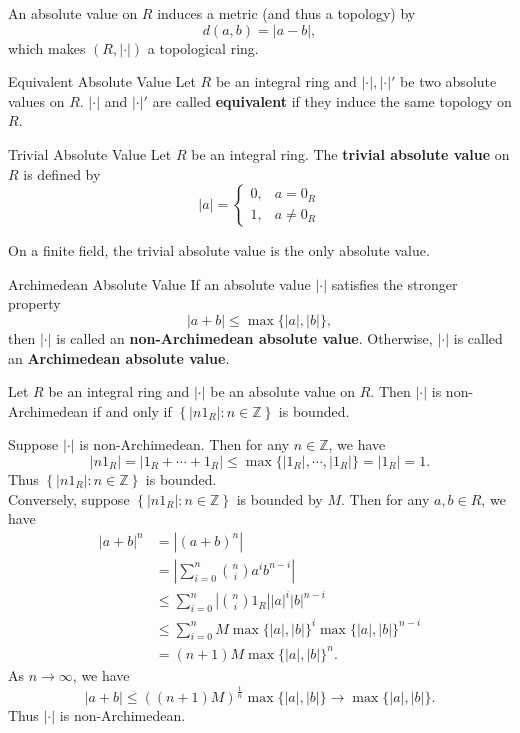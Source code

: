 An absolute value on $R$ induces a metric (and thus a topology) by 
\[
    d(a,b)=|a-b|,
\]
which makes $(R,|\cdot|)$ a topological ring. 
\begin{definition}{Equivalent Absolute Value}{}
    Let $R$ be an integral ring and $|\cdot|,|\cdot|'$ be two absolute values on $R$. $|\cdot|$ and $|\cdot|'$ are called \textbf{equivalent} if they induce the same topology on $R$.
\end{definition}

\begin{definition}{Trivial Absolute Value}{}
    Let $R$ be an integral ring. The \textbf{trivial absolute value} on $R$ is defined by 
    \[
        |a|=\begin{cases}
            0, & a=0_R\\
            1, & a\ne 0_R
        \end{cases}
    \]
\end{definition}

On a finite field, the trivial absolute value is the only absolute value.
\begin{definition}{Archimedean Absolute Value}{}
    If an absolute value $|\cdot|$ satisfies the stronger property 
    \[
        |a+b|\le \max\{|a|,|b|\},
    \]
    then $|\cdot|$ is called an \textbf{non-Archimedean absolute value}. Otherwise, $|\cdot|$ is called an \textbf{Archimedean absolute value}.
\end{definition}

\begin{proposition}{}{}
    Let $R$ be an integral ring and $|\cdot|$ be an absolute value on $R$. Then $|\cdot|$ is non-Archimedean if and only if $\left\{ |n1_R|:n\in \mathbb{Z}\right\}$ is bounded.
\end{proposition}

\begin{prf}
    Suppose $|\cdot|$ is non-Archimedean. Then for any $n\in\mathbb{Z}$, we have
    \[
        |n1_R|=|1_R+\cdots+1_R|\le \max\{|1_R|,\cdots,|1_R|\}=|1_R|=1.
    \]
    Thus $\left\{ |n1_R|:n\in \mathbb{Z}\right\}$ is bounded.\\
    Conversely, suppose $\left\{ |n1_R|:n\in \mathbb{Z}\right\}$ is bounded by $M$. Then for any $a,b\in R$, we have 
    \begin{align*}
        |a+b|^n&=|(a+b)^n|\\
        &=\left| \sum_{i=0}^n\binom{n}{i}a^ib^{n-i}\right|\\
        &\le \sum_{i=0}^n\left|\binom{n}{i}1_R\right||a|^i|b|^{n-i}\\
        &\le \sum_{i=0}^n M\max\{|a|,|b|\}^i\max\{|a|,|b|\}^{n-i}\\
        &=(n+1) M \max\{|a|,|b|\}^n.
    \end{align*}
    As $n\to \infty$, we have
    \[
        |a+b|\le \left((n+1) M \right)^{\frac{1}{n}}\max\{|a|,|b|\}\to \max\{|a|,|b|\}.
        \]
    Thus $|\cdot|$ is non-Archimedean.
\end{prf}



